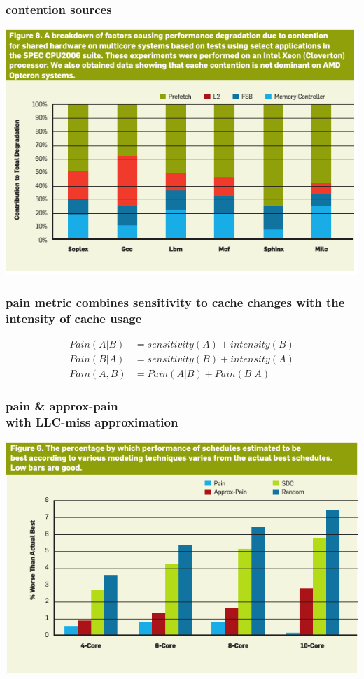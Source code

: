 \documentclass[utf8,10pt]{beamer}
\begin{document}
\begin{frame}
  \frametitle{contention sources }
  \centering
  \includegraphics[height=0.7\textheight, keepaspectratio]{./contention_shared_hw}
\end{frame}


\begin{frame}
  \frametitle{pain metric combines sensitivity to cache
    changes with the intensity of cache usage}
  \centering
  \begin{align*}
    Pain(A|B) &= sensitivity(A) + intensity(B) \\
    Pain(B|A) &= sensitivity(B) + intensity(A) \\
    Pain(A,B) &= Pain(A|B) + Pain(B|A)
  \end{align*}
\end{frame}


\begin{frame}
  \frametitle{pain \& approx-pain \\ with LLC-miss approximation
    }
  \centering
  \includegraphics[height=0.7\textheight, keepaspectratio]{./pain_approx_comp}
\end{frame}
\end{document}
